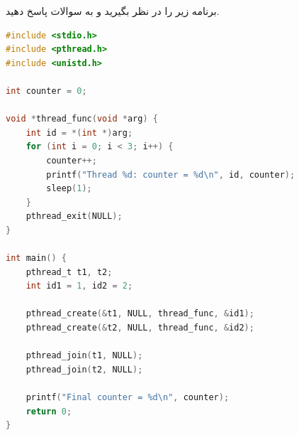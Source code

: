 \question[20]
برنامه زیر را در نظر بگیرید و به سوالات پاسخ دهید.

\begin{latin}
    \begin{lstlisting}[language=C]
#include <stdio.h>
#include <pthread.h>
#include <unistd.h>

int counter = 0;

void *thread_func(void *arg) {
    int id = *(int *)arg;
    for (int i = 0; i < 3; i++) {
        counter++;
        printf("Thread %d: counter = %d\n", id, counter);
        sleep(1);
    }
    pthread_exit(NULL);
}

int main() {
    pthread_t t1, t2;
    int id1 = 1, id2 = 2;
    
    pthread_create(&t1, NULL, thread_func, &id1);
    pthread_create(&t2, NULL, thread_func, &id2);
    
    pthread_join(t1, NULL);
    pthread_join(t2, NULL);
    
    printf("Final counter = %d\n", counter);
    return 0;
}
\end{lstlisting}
\end{latin}


